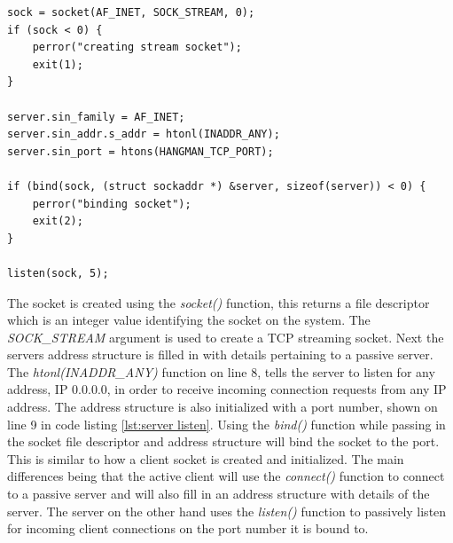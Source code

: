 \documentclass[12pt,a4paper,titlepage]{article}
\begin{document}
\begin{lstlisting}[caption=Server listen socket implementation \cite{stevensunp},label=lst:server listen]
sock = socket(AF_INET, SOCK_STREAM, 0); 
if (sock < 0) {
	perror("creating stream socket");
	exit(1);
}

server.sin_family = AF_INET;
server.sin_addr.s_addr = htonl(INADDR_ANY);
server.sin_port = htons(HANGMAN_TCP_PORT);

if (bind(sock, (struct sockaddr *) &server, sizeof(server)) < 0) {
	perror("binding socket");
	exit(2);
}

listen(sock, 5);
\end{lstlisting}

The socket is created using the \textit{socket()} function, this returns a file descriptor which is an integer value identifying the socket on the system. The \textit{SOCK\_STREAM} argument is used to create a TCP streaming socket. Next the servers address structure is filled in with details pertaining to a passive server. The \textit{htonl(INADDR\_ANY)} function on line 8, tells the server to listen for any address, IP 0.0.0.0, in order to receive incoming connection requests from any IP address. The address structure is also initialized with a port number, shown on line 9 in code listing \ref{lst:server listen}. Using the \textit{bind()} function while passing in the socket file descriptor and address structure will bind the socket to the port.\\ 

This is similar to how a client socket is created and initialized. The main differences being that the active client will use the \textit{connect()} function to connect to a passive server and will also fill in an address structure with details of the server. The server on the other hand uses the \textit{listen()} function to passively listen for incoming client connections on the port number it is bound to. \\
\end{document}
